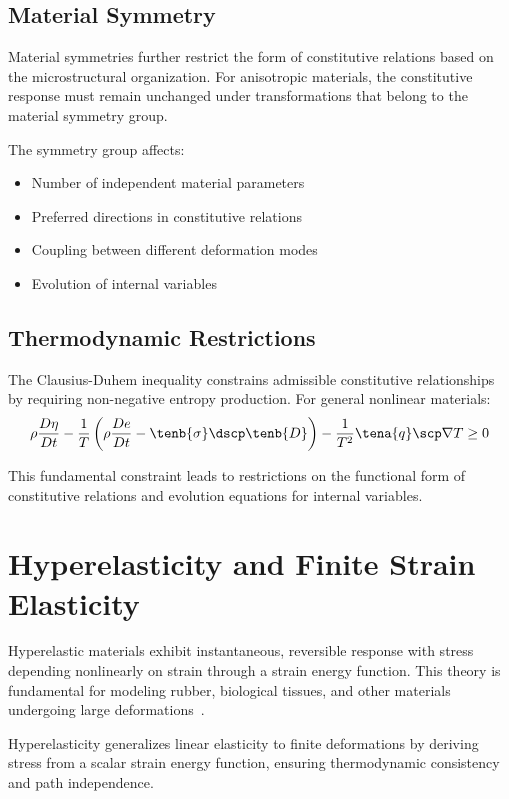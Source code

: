 \subsection{Material Symmetry}

Material symmetries further restrict the form of constitutive relations based on the microstructural organization. For anisotropic materials, the constitutive response must remain unchanged under transformations that belong to the material symmetry group.

The symmetry group affects:
\begin{itemize}
\item Number of independent material parameters
\item Preferred directions in constitutive relations
\item Coupling between different deformation modes
\item Evolution of internal variables
\end{itemize}

\subsection{Thermodynamic Restrictions}

The Clausius-Duhem inequality constrains admissible constitutive relationships by requiring non-negative entropy production. For general nonlinear materials:
\begin{equation}
\rho \frac{D\eta}{Dt} - \frac{1}{T}\left(\rho \frac{De}{Dt} - \tenb{\sigma} \dscp \tenb{D}\right) - \frac{1}{T^2}\tena{q} \scp \nabla T \geq 0
\end{equation}

This fundamental constraint leads to restrictions on the functional form of constitutive relations and evolution equations for internal variables.

\section{Hyperelasticity and Finite Strain Elasticity}

Hyperelastic materials exhibit instantaneous, reversible response with stress depending nonlinearly on strain through a strain energy function. This theory is fundamental for modeling rubber, biological tissues, and other materials undergoing large deformations~\autocite{Sadd.2019}.

\begin{keypoint}
Hyperelasticity generalizes linear elasticity to finite deformations by deriving stress from a scalar strain energy function, ensuring thermodynamic consistency and path independence.
\end{keypoint}

